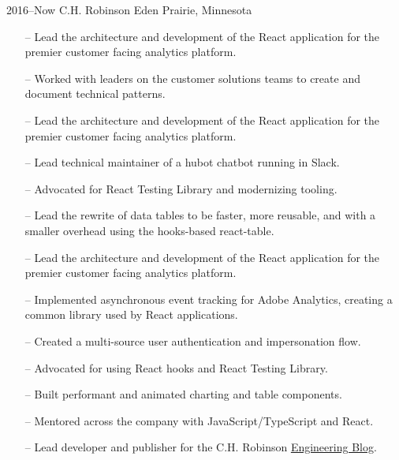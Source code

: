 \documentclass[]{cv-style} %
\begin{document}
\begin{entrylist}

\entry
{2016--Now}
{C.H. Robinson}
{Eden Prairie, Minnesota}
{
\begin{itemize}
    \item[--] Lead the architecture and development of the React application for the premier customer facing analytics platform.
    \item[--] Worked with leaders on the customer solutions teams to create and document technical patterns.
\end{itemize}

\begin{itemize}
    \item[--] Lead the architecture and development of the React application for the premier customer facing analytics platform.
    \item[--] Lead technical maintainer of a hubot chatbot running in Slack.
    \item[--] Advocated for React Testing Library and modernizing tooling.
    \item[--] Lead the rewrite of data tables to be faster, more reusable, and with a smaller overhead using the hooks-based react-table.
\end{itemize}

\begin{itemize}
    \item[--] Lead the architecture and development of the React application for the premier customer facing analytics platform.
    \item[--] Implemented asynchronous event tracking for Adobe Analytics, creating a common library used by React applications.
    \item[--] Created a multi-source user authentication and impersonation flow.
    \item[--] Advocated for using React hooks and React Testing Library.
    \item[--] Built performant and animated charting and table components.
    \item[--] Mentored across the company with JavaScript/TypeScript and React.
    \item[--] Lead developer and publisher for the C.H. Robinson \href{https://engineering.chrobinson.com}{Engineering Blog}.
\end{itemize}

}
\end{entrylist}
\end{document}
